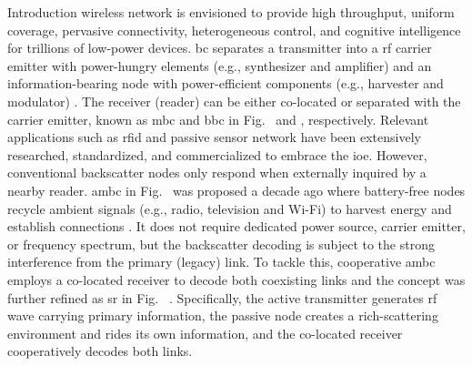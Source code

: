 \documentclass[journal]{IEEEtran}
\begin{document}
\glsresetall

\begin{section}{Introduction}
	 wireless network is envisioned to provide high throughput, uniform coverage, pervasive connectivity, heterogeneous control, and cognitive intelligence for trillions of low-power devices.
	\gls{bc} separates a transmitter into a \gls{rf} carrier emitter with power-hungry elements (e.g., synthesizer and amplifier) and an information-bearing node with power-efficient components (e.g., harvester and modulator) \cite{Boyer2014}.
	The receiver (reader) can be either co-located or separated with the carrier emitter, known as \gls{mbc} and \gls{bbc} in Fig.~ and , respectively.
	Relevant applications such as \gls{rfid} \cite{Dobkin2012,Landt2005} and passive sensor network \cite{Vannucci2008,Assimonis2016} have been extensively researched, standardized, and commercialized to embrace the \gls{ioe}.
	However, conventional backscatter nodes only respond when externally inquired by a nearby reader.
	\gls{ambc} in Fig.~ was proposed a decade ago where battery-free nodes recycle ambient signals (e.g., radio, television and Wi-Fi) to harvest energy and establish connections \cite{Liu2013b}.
	It does not require dedicated power source, carrier emitter, or frequency spectrum, but the backscatter decoding is subject to the strong interference from the primary (legacy) link.
	To tackle this, cooperative \gls{ambc} \cite{Yang2018} employs a co-located receiver to decode both coexisting links and the concept was further refined as \gls{sr} in Fig.~ \cite{Liang2020}.
	Specifically, the active transmitter generates \gls{rf} wave carrying primary information, the passive node creates a rich-scattering environment and rides its own information, and the co-located receiver cooperatively decodes both links.

\end{section}
\end{document}
